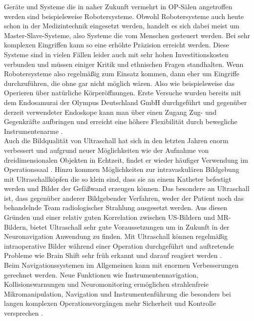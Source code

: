 Geräte und Systeme die in naher Zukunft vermehrt in OP-Sälen angetroffen werden sind beispielsweise Robotersysteme. Obwohl Robotersysteme auch heute schon in der Medizintechnik eingesetzt werden, handelt es sich dabei meist um Master-Slave-Systeme, also Systeme die vom Menschen gesteuert werden. Bei sehr komplexen Eingriffen kann so eine erhöhte Präzision erreicht werden. Diese Systeme sind in vielen Fällen leider auch mit sehr hohen Investitionskosten verbunden und müssen einiger Kritik und ethnischen Fragen standhalten. Wenn Robotersysteme also regelmäßig zum Einsatz kommen, dann eher um Eingriffe durchzuführen, die ohne gar nicht möglich wären. Also wie beispielsweise das Operieren über natürliche Körperöffnungen. Erste Versuche wurden bereits mit dem Endosamurai der Olympus Deutschland GmbH durchgeführt \cite{DerDigitaleOperationssaal} und gegenüber derzeit verwendeter Endoskope kann man über einen Zugang Zug- und Gegenkräfte aufbringen und erreicht eine höhere Flexibilität durch bewegliche Instrumentenarme \cite{Endosamurai}. \\
Auch die Bildqualität von Ultraschall hat sich in den letzten Jahren enorm verbessert und aufgrund neuer Möglichkeiten wie der Aufnahme von dreidimensionalen Objekten in Echtzeit, findet er wieder häufiger Verwendung im Operationssaal \cite{BrainShiftInTumorResection}. Hinzu kommen Möglichkeiten zur intravaskulären Bildgebung mit Ultraschallköpfen die so klein sind, dass sie an einem Katheter befestigt werden und Bilder der Gefäßwand erzeugen können. Das besondere an Ultraschall ist, dass gegenüber anderer Bildgebender Verfahren, weder der Patient noch das behandelnde Team radiologischer Strahlung ausgesetzt werden\cite{CurrentAndFuture}. Aus diesen Gründen und einer relativ guten Korrelation zwischen US-Bildern und MR-Bildern, bietet Ultraschall sehr gute Voraussetzungen um in Zukunft in der Neuronavigation Anwendung zu finden. Mit Ultraschall können regelmäßig intraoperative Bilder während einer Operation durchgeführt und auftretende Probleme wie Brain Shift sehr früh erkannt und darauf reagiert werden \cite{BrainShiftInTumorResection}. \\
Beim Navigationssystemen im Allgemeinen kann mit enormen Verbesserungen gerechnet werden. Neue Funktionen wie Instrumentennavigation, Kollisionswarnungen und Neuromonitoring ermöglichen strahlenfreie Mikromanipulation, Navigation und Instrumentenführung die besonders bei langen komplexen Operationsvorgängen mehr Sicherheit und Kontrolle versprechen \cite{DerDigitaleOperationssaal,CurrentAndFuture}. 

